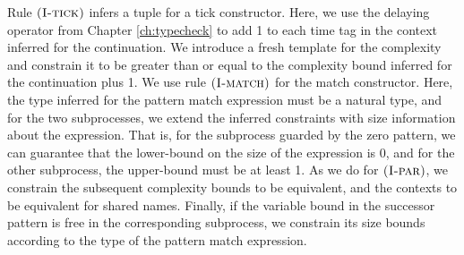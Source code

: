 Rule $\mbox{\textsc{\protect{(I-tick})}}$ infers a tuple for a tick constructor. Here, we use the delaying operator from Chapter \ref{ch:typecheck} to add 1 to each time tag in the context inferred for the continuation. We introduce a fresh template for the complexity and constrain it to be greater than or equal to the complexity bound inferred for the continuation plus 1. We use rule $\mbox{\textsc{\protect{(I-match})}}$ for the match constructor. Here, the type inferred for the pattern match expression must be a natural type, and for the two subprocesses, we extend the inferred constraints with size information about the expression. That is, for the subprocess guarded by the zero pattern, we can guarantee that the lower-bound on the size of the expression is 0, and for the other subprocess, the upper-bound must be at least 1. As we do for $\mbox{\textsc{\protect{(I-par})}}$, we constrain the subsequent complexity bounds to be equivalent, and the contexts to be equivalent for shared names. Finally, if the variable bound in the successor pattern is free in the corresponding subprocess, we constrain its size bounds according to the type of the pattern match expression.\\
%
